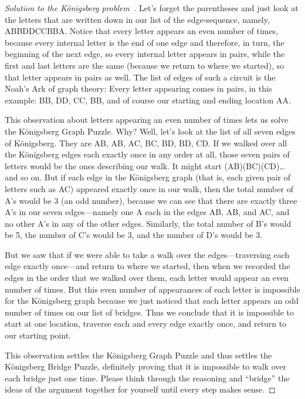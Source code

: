 \begin{proof}[Solution to the K\"onigsberg problem~\cite{Burger2013}]
Let's forget the parentheses and just look at the letters that are written down in our list of the edge-sequence, namely, ABBDDCCBBA. Notice that every letter appears an even number of times, because every internal letter is the end of one edge and therefore, in turn, the beginning of the next edge, so every internal letter appears in pairs, while the first and last letters are the same (because we return to where we started), so that letter appears in pairs as well. 
The list of edges of such a circuit is the Noah's Ark of graph theory: Every letter appearing comes in pairs, in this example: BB, DD, CC, BB, and of course our starting and ending location AA.

This observation about letters appearing an even number of times lets us solve the Königsberg Graph Puzzle. Why? Well, let's look at the list of all seven edges of Königsberg. They are AB, AB, AC, BC, BD, BD, CD. If we walked over all the Königsberg edges each exactly once in any order at all, those seven pairs of letters would be the ones describing our walk. It might start (AB)(BC)(CD)… and so on. But if each edge in the Königsberg graph (that is, each given pair of letters such as AC) appeared exactly once in our walk, then the total number of A's would be 3 (an odd number), because we can see that there are exactly three A's in our seven edges—namely one A each in the edges AB, AB, and AC, and no other A's in any of the other edges. Similarly, the total number of B's would be 5, the number of C's would be 3, and the number of D's would be 3.

But we saw that if we were able to take a walk over the edges—traversing each edge exactly once—and return to where we started, then when we recorded the edges in the order that we walked over them, each letter would appear an even number of times. But this even number of appearances of each letter is impossible for the Königsberg graph because we just noticed that each letter appears an odd number of times on our list of bridges. Thus we conclude that it is impossible to start at one location, traverse each and every edge exactly once, and return to our starting point.

This observation settles the Königsberg Graph Puzzle and thus settles the Königsberg Bridge Puzzle, definitely proving that it is impossible to walk over each bridge just one time. Please think through the reasoning and “bridge” the ideas of the argument together for yourself until every step makes sense.
\end{proof}

